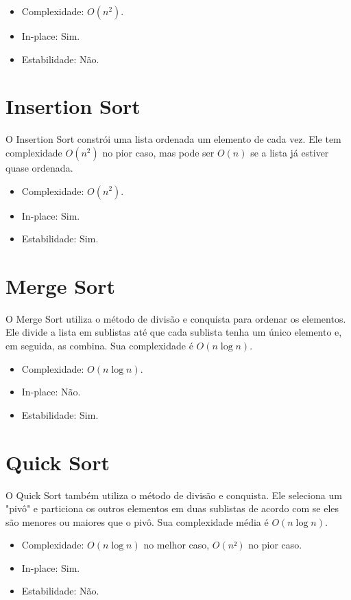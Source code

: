 \documentclass[tcc2]{uftex}
\begin{document}
\begin{itemize}
    \item Complexidade: \(O(n^2)\).
    \item In-place: Sim.
    \item Estabilidade: Não.
\end{itemize}

\section{Insertion Sort}
O Insertion Sort constrói uma lista ordenada um elemento de cada vez. Ele tem complexidade \(O(n^2)\) no pior caso, mas pode ser \(O(n)\) se a lista já estiver quase ordenada.

\begin{itemize}
    \item Complexidade: \(O(n^2)\).
    \item In-place: Sim.
    \item Estabilidade: Sim.
\end{itemize}


\section{Merge Sort}
O Merge Sort utiliza o método de divisão e conquista para ordenar os elementos. Ele divide a lista em sublistas até que cada sublista tenha um único elemento e, em seguida, as combina. Sua complexidade é \(O(n \log n)\).

\begin{itemize}
    \item Complexidade: \(O(n \log n)\).
    \item In-place: Não.
    \item Estabilidade: Sim.
\end{itemize}

\section{Quick Sort}
O Quick Sort também utiliza o método de divisão e conquista. Ele seleciona um "pivô"  e particiona os outros elementos em duas sublistas de acordo com se eles são menores ou maiores que o pivô. Sua complexidade média é \(O(n \log n)\).

\begin{itemize}
    \item Complexidade: \(O(n \log n)\) no melhor caso, \(O(n²)\) no pior caso.
    \item In-place: Sim.
    \item Estabilidade: Não.
\end{itemize}
\end{document}
